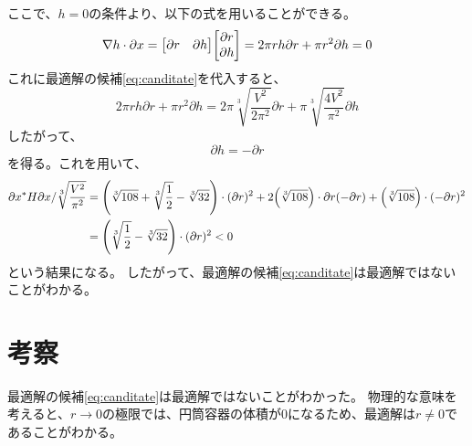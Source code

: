 \documentclass{jsarticle}
\begin{document}
ここで、$h=0$の条件より、以下の式を用いることができる。
\begin{equation}
  \nabla h \cdot \partial x = \mqty[\partial{r} & \partial{h}] \mqty[\partial{r} \\ \partial{h}] = 
  2\pi r h \partial{r} + \pi r^2 \partial{h} = 0
\end{equation}
これに最適解の候補\eqref{eq:canditate}を代入すると、
\begin{equation}
  2\pi r h \partial{r} + \pi r^2 \partial{h} 
  = 2\pi \sqrt[3]{\frac{V^2}{2\pi^2}} \partial{r} + \pi \sqrt[3]{\frac{4V^2}{\pi^2}} \partial{h}
\end{equation}
したがって、
\begin{equation}
  \partial{h} = -\partial{r}
\end{equation}
を得る。これを用いて、
\begin{align}
  \partial{x}^*H\partial{x}
  / \sqrt[3]{\frac{V^2}{\pi^2}}
  &=
  \qty(\sqrt[3]{108} + \sqrt[3]{\frac{1}{2}} - \sqrt[3]{32}) \cdot (\partial{r})^2
  + 2\qty(\sqrt[3]{108}) \cdot \partial{r}(-\partial{r})
  + \qty(\sqrt[3]{108}) \cdot (-\partial{r})^2 \\
  &=\qty(\sqrt[3]{\frac{1}{2}} - \sqrt[3]{32}) \cdot (\partial{r})^2 
  < 0
\end{align}
という結果になる。
したがって、最適解の候補\eqref{eq:canditate}は最適解ではないことがわかる。

\section{考察}
最適解の候補\eqref{eq:canditate}は最適解ではないことがわかった。
物理的な意味を考えると、$r\to 0$の極限では、円筒容器の体積が$0$になるため、最適解は$r\neq 0$であることがわかる。
\end{document}

